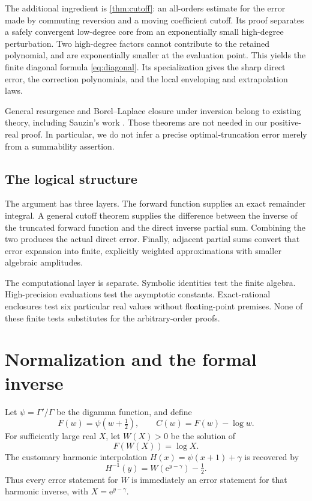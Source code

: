 \documentclass[11pt,a4paper]{article}
\theoremstyle{definition}
\numberwithin{equation}{section}
\newcommand{\e}{\mathrm e}
\begin{document}
The additional ingredient is \cref{thm:cutoff}: an all-orders estimate for the error made by commuting reversion and a moving coefficient cutoff. Its proof separates a safely convergent low-degree core from an exponentially small high-degree perturbation. Two high-degree factors cannot contribute to the retained polynomial, and are exponentially smaller at the evaluation point. This yields the finite diagonal formula \eqref{eq:diagonal}. Its specialization gives the sharp direct error, the correction polynomials, and the local enveloping and extrapolation laws.

General resurgence and Borel--Laplace closure under inversion belong to existing theory, including Sauzin's work \cite{sauzin}. Those theorems are not needed in our positive-real proof. In particular, we do not infer a precise optimal-truncation error merely from a summability assertion.

\subsection{The logical structure}
The argument has three layers. The forward function supplies an exact remainder integral. A general cutoff theorem supplies the difference between the inverse of the truncated forward function and the direct inverse partial sum. Combining the two produces the actual direct error. Finally, adjacent partial sums convert that error expansion into finite, explicitly weighted approximations with smaller algebraic amplitudes.

The computational layer is separate. Symbolic identities test the finite algebra. High-precision evaluations test the asymptotic constants. Exact-rational enclosures test six particular real values without floating-point premises. None of these finite tests substitutes for the arbitrary-order proofs.

\section{Normalization and the formal inverse}
\label{sec:normalization}

Let $\psi=\Gamma'/\Gamma$ be the digamma function, and define
\begin{equation}
 F(w)=\psi(w+\tfrac12),\qquad C(w)=F(w)-\log w.
 \label{eq:F}
\end{equation}
For sufficiently large real $X$, let $W(X)>0$ be the solution of
\begin{equation}
 F(W(X))=\log X.
 \label{eq:inverse}
\end{equation}
The customary harmonic interpolation $H(x)=\psi(x+1)+\gamma$ is recovered by
\begin{equation}
 H^{-1}(y)=W(\e^{y-\gamma})-\tfrac12.
 \label{eq:harmonic}
\end{equation}
Thus every error statement for $W$ is immediately an error statement for that harmonic inverse, with $X=\e^{y-\gamma}$.
\end{document}
